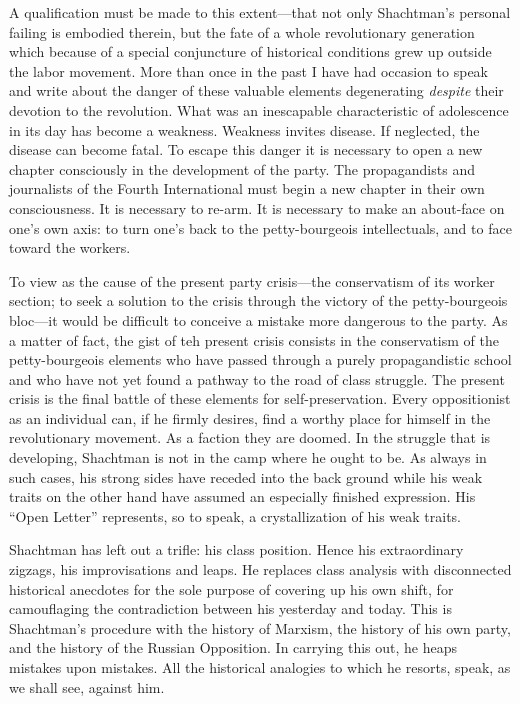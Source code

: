 A qualification must be made to this extent---that not only Shachtman’s personal failing is embodied therein, but the fate of a whole revolutionary generation which because of a special conjuncture of historical conditions grew up outside the labor movement. More than once in the past I have had occasion to speak and write about the danger of these valuable elements degenerating \emph{despite} their devotion to the revolution. What was an inescapable characteristic of adolescence in its day has become a weakness. Weakness invites disease. If neglected, the disease can become fatal. To escape this danger it is necessary to open a new chapter consciously in the development of the party. The propagandists and journalists of the Fourth International must begin a new chapter in their own consciousness. It is necessary to re-arm. It is necessary to make an about-face on one’s own axis: to turn one’s back to the petty-bourgeois intellectuals, and to face toward the workers.

To view as the cause of the present party crisis---the conservatism of its worker section; to seek a solution to the crisis through the victory of the petty-bourgeois bloc---it would be difficult to conceive a mistake more dangerous to the party. As a matter of fact, the gist of teh present crisis consists in the conservatism of the petty-bourgeois elements who have passed through a purely propagandistic school and who have not yet found a pathway to the road of class struggle. The present crisis is the final battle of these elements for self-preservation. Every oppositionist as an individual can, if he firmly desires, find a worthy place for himself in the revolutionary movement. As a faction they are doomed. In the struggle that is developing, Shachtman is not in the camp where he ought to be. As always in such cases, his strong sides have receded into the back ground while his weak traits on the other hand have assumed an especially finished expression. His ``Open Letter'' represents, so to speak, a crystallization of his weak traits.

Shachtman has left out a trifle: his class position. Hence his extraordinary zigzags, his improvisations and leaps. He replaces class analysis with disconnected historical anecdotes for the sole purpose of covering up his own shift, for camouflaging the contradiction between his yesterday and today. This is Shachtman’s procedure with the history of Marxism, the history of his own party, and the history of the Russian Opposition. In carrying this out, he heaps mistakes upon mistakes. All the historical analogies to which he resorts, speak, as we shall see, against him.


